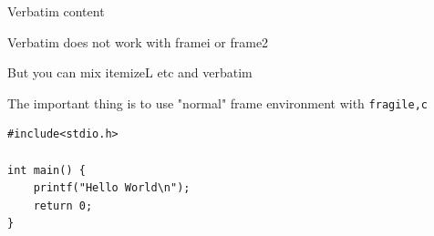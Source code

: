\documentclass[11pt,compress,t,notes=noshow, xcolor=table]{beamer}
\begin{document}

\begin{frame}[fragile,c]{Verbatim content}

\begin{itemizeL}
  \item Verbatim does not work with framei or frame2 
  \item But you can mix itemizeL etc and verbatim
  \item The important thing is to use "normal" frame environment with \texttt{fragile,c}
\end{itemizeL}

\vfill

\begin{verbatim}
#include<stdio.h>

int main() {
	printf("Hello World\n");
	return 0;
}
\end{verbatim}

\end{frame}

\endlecture
\end{document}
